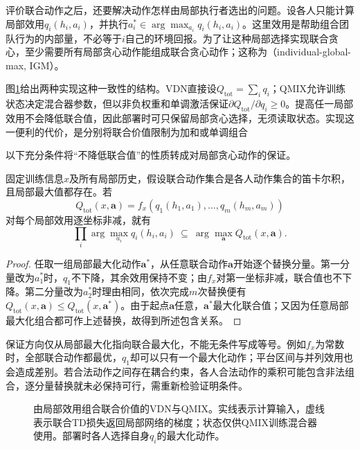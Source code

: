 评价联合动作之后，还要解决动作怎样由局部执行者选出的问题。设各人只能计算局部效用$q_i(h_i,a_i)$，并执行$a_i^*\in\arg\max_{a_i}q_i(h_i,a_i)$。这里效用是帮助组合团队行为的内部量，不必等于$i$自己的环境回报。为了让这种局部选择实现联合贪心，至少需要所有局部贪心动作能组成联合贪心动作；这称为（individual-global-max, IGM）。

图\ref{fig:rl-multi-agent-mixers}给出两种实现这种一致性的结构。VDN直接设$Q_{\text{tot}}=\sum_i q_i$；QMIX允许训练状态决定混合器参数，但以非负权重和单调激活保证$\partial Q_{\text{tot}}/\partial q_i\geq0$。提高任一局部效用不会降低联合值，因此部署时可只保留局部贪心选择，无须读取状态。实现这一便利的代价，是分别将联合价值限制为加和或单调组合

以下充分条件将“不降低联合值”的性质转成对局部贪心动作的保证。

\begin{theorem}[单调组合的局部贪心充分性]
\label{thm:rl-multi-agent-monotone}
固定训练信息$x$及所有局部历史，假设联合动作集合是各人动作集合的笛卡尔积，且局部最大值都存在。若
\[
 Q_{\text{tot}}(x,\bm a)
 =f_x(q_1(h_1,a_1),\ldots,q_m(h_m,a_m))
\]
对每个局部效用逐坐标非减，就有
\[
 \prod_i\arg\max_{a_i}q_i(h_i,a_i)
 \ \subseteq\ \arg\max_{\bm a}Q_{\text{tot}}(x,\bm a).
\]
\end{theorem}
\begin{proof}
任取一组局部最大化动作$\bm a^*$，从任意联合动作$\bm a$开始逐个替换分量。第一分量改为$a_1^*$时，$q_1$不下降，其余效用保持不变；由$f_x$对第一坐标非减，联合值也不下降。第二分量改为$a_2^*$时理由相同，依次完成$m$次替换便有
$Q_{\text{tot}}(x,\bm a)\leq Q_{\text{tot}}(x,\bm a^*)$。由于起点$\bm a$任意，$\bm a^*$最大化联合值；又因为任意局部最大化组合都可作上述替换，故得到所述包含关系。
\end{proof}

保证方向仅从局部最大化指向联合最大化，不能无条件写成等号。例如$f_x$为常数时，全部联合动作都最优，$q_1$却可以只有一个最大化动作；平台区间与并列效用也会造成差别。若合法动作之间存在耦合约束，各人合法动作的乘积可能包含非法组合，逐分量替换就未必保持可行，需重新检验证明条件。

\begin{figure}[htbp]
 \centering
 
 \caption{由局部效用组合联合价值的VDN与QMIX。实线表示计算输入，虚线表示联合TD损失返回局部网络的梯度；状态仅供QMIX训练混合器使用。部署时各人选择自身$q_i$的最大化动作。}
 \label{fig:rl-multi-agent-mixers}
\end{figure}


